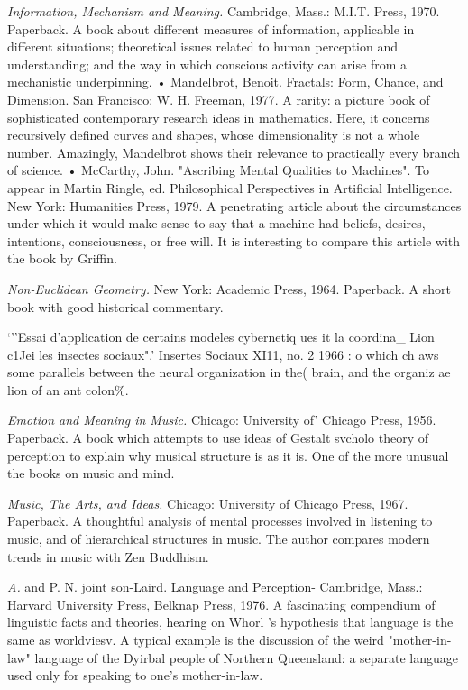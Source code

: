  {\sl Information, Mechanism and Meaning.} Cambridge, Mass.: M.I.T. Press, 1970. Paperback. A book about different measures of information, applicable in different situations; theoretical issues related to human perception and understanding; and the way in which conscious activity can arise from a mechanistic underpinning. • Mandelbrot, Benoit. Fractals: Form, Chance, and Dimension. San Francisco: W. H. Freeman, 1977. A rarity: a picture book of sophisticated contemporary research ideas in mathematics. Here, it concerns recursively defined curves and shapes, whose dimensionality is not a whole number. Amazingly, Mandelbrot shows their relevance to practically every branch of science. • McCarthy, John. "Ascribing Mental Qualities to Machines". To appear in Martin Ringle, ed. Philosophical Perspectives in Artificial Intelligence. New York: Humanities Press, 1979. A penetrating article about the circumstances under which it would make sense to say that a machine had beliefs, desires, intentions, consciousness, or free will. It is interesting to compare this article with the book by Griffin.

 {\sl Non-Euclidean Geometry.} New York: Academic Press, 1964. Paperback. A short book with good historical commentary.

 `''Essai d'application de certains modeles cybernetiq ues it la coordina\_ Lion c1Jei les insectes sociaux".' Insertes Sociaux XI11, no. 2 1966 : o which ch aws some parallels between the neural organization in the( brain, and the organiz ae lion of an ant colon\%.

 {\sl Emotion and Meaning in Music.} Chicago: University of' Chicago Press, 1956. Paperback. A book which attempts to use ideas of Gestalt svcholo theory of perception to explain why musical structure is as it is. One of the more unusual the books on music and mind.

 {\sl Music, The Arts, and Ideas.} Chicago: University of Chicago Press, 1967. Paperback. A thoughtful analysis of mental processes involved in listening to music, and of hierarchical structures in music. The author compares modern trends in music with Zen Buddhism.

 {\sl A.} and P. N. joint son-Laird. Language and Perception- Cambridge, Mass.: Harvard University Press, Belknap Press, 1976. A fascinating compendium of linguistic facts and theories, hearing on Whorl 's hypothesis that language is the same as worldviesv. A typical example is the discussion of the weird "mother-in-law" language of the Dyirbal people of Northern Queensland: a separate language used only for speaking to one's mother-in-law.

